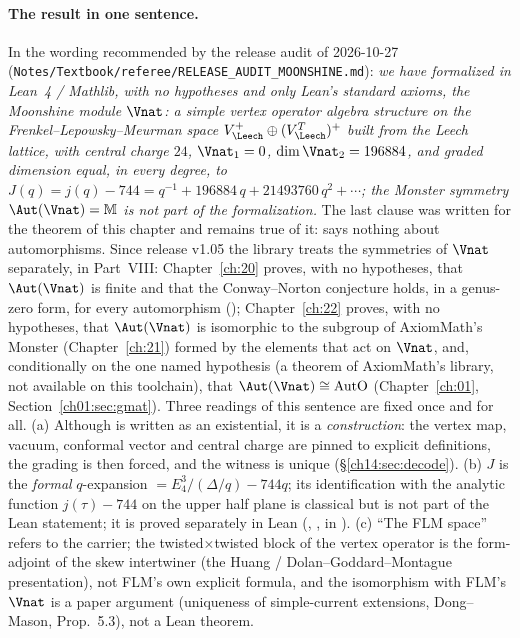 \paragraph{The result in one sentence.}  In the wording recommended by the release audit of
2026-10-27 (\texttt{Notes/Textbook/referee/RELEASE\_AUDIT\_MOONSHINE.md}): \emph{we have formalized
in Lean~4 / Mathlib, with no hypotheses and only Lean's standard axioms, the Moonshine module
$\Vnat$: a simple vertex operator algebra structure on the Frenkel--Lepowsky--Meurman space
$V_\Leech^+\oplus(V_\Leech^T)^+$ built from the Leech lattice, with central charge $24$,
$\Vnat_1=0$, $\dim\Vnat_2=196884$, and graded dimension equal, in every degree, to
$J(q)=j(q)-744=q^{-1}+196884\,q+21493760\,q^2+\cdots$; the Monster symmetry $\Aut(\Vnat)=\mathbb M$ is
not part of the formalization.}  The last clause was written for the theorem of this chapter and remains true of it:
 says nothing about automorphisms.  Since release v1.05 the library treats the symmetries of $\Vnat$
separately, in Part~VIII: Chapter~\ref{ch:20} proves, with no hypotheses, that $\Aut(\Vnat)$ is finite and that the
Conway--Norton conjecture holds, in a genus-zero form, for every automorphism (); Chapter~\ref{ch:22}
proves, with no hypotheses, that $\Aut(\Vnat)$ is isomorphic to the subgroup of AxiomMath's Monster 
(Chapter~\ref{ch:21}) formed by the elements that act on $\Vnat$, and, conditionally on the one named hypothesis
 (a theorem of AxiomMath's library, not available on this toolchain), that $\Aut(\Vnat)\cong\mathrm{AutO}$
(Chapter~\ref{ch:01}, Section~\ref{ch01:sec:gmat}).  Three readings of this sentence are fixed once and for all.
(a) Although  is written as an existential, it is a \emph{construction}: the vertex
map, vacuum, conformal vector and central charge are pinned to explicit definitions, the grading is
then forced, and the witness is unique (\S\ref{ch14:sec:decode}).  (b) $J$ is the \emph{formal}
$q$-expansion  $=E_4^3/(\Delta/q)-744q$; its identification with the analytic function
$j(\tau)-744$ on the upper half plane is classical but is not part of the Lean statement; it is proved separately in Lean
(, , in ).
(c) ``The FLM space'' refers to the carrier; the twisted$\times$twisted block of the vertex
operator is the form-adjoint of the skew intertwiner (the Huang / Dolan--Goddard--Montague
presentation), not FLM's own explicit formula, and the isomorphism with FLM's $\Vnat$ is a paper
argument (uniqueness of simple-current extensions, Dong--Mason, Prop.~5.3), not a Lean theorem.

